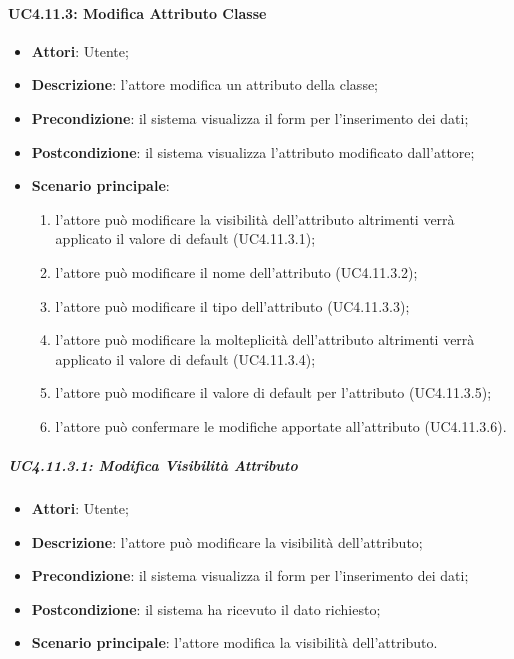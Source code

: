 \paragraph{UC4.11.3: Modifica Attributo Classe}
\label{UC4.11.3}
\begin{itemize}
\item \textbf{Attori}: Utente;
\item \textbf{Descrizione}: l'attore modifica un attributo della classe;	
\item \textbf{Precondizione}: il sistema visualizza il form per l'inserimento dei dati;	
\item \textbf{Postcondizione}: il sistema visualizza l'attributo modificato dall'attore;	
\item \textbf{Scenario principale}:
\begin{enumerate}
\item l'attore può modificare la visibilità dell'attributo altrimenti verrà applicato il valore di default (UC4.11.3.1);
\item l'attore può modificare il nome dell'attributo (UC4.11.3.2);
\item l'attore può modificare il tipo dell'attributo (UC4.11.3.3);
\item l'attore può modificare la molteplicità dell'attributo altrimenti verrà applicato il valore di default (UC4.11.3.4);
\item l'attore può modificare il valore di default per l'attributo (UC4.11.3.5);
\item l'attore può confermare le modifiche apportate all'attributo (UC4.11.3.6).
\end{enumerate}
\end{itemize}

\subparagraph{UC4.11.3.1: Modifica Visibilità Attributo}
\label{UC4.11.3.1}
\begin{itemize}
\item \textbf{Attori}: Utente;
\item \textbf{Descrizione}: l'attore può modificare la visibilità dell'attributo;	
\item \textbf{Precondizione}: il sistema visualizza il form per l'inserimento dei dati;	
\item \textbf{Postcondizione}: il sistema ha ricevuto il dato richiesto;	
\item \textbf{Scenario principale}:
l'attore modifica la visibilità dell'attributo.
\end{itemize}

